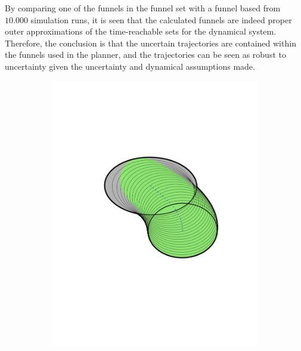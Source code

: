 By comparing one of the funnels in the funnel set with a funnel based from
\(10.000\) simulation runs, it is seen that the calculated funnels are indeed
proper outer approximations of the time-reachable sets for the dynamical system.
Therefore, the conclusion is that the uncertain trajectories are contained
within the funnels used in the planner, and the trajectories can be seen as
robust to uncertainty given the uncertainty and dynamical assumptions made.

\begin{figure}
  \begin{subfigure}[b]{0.3\textwidth}
    \includegraphics[width=\textwidth]{figures/method/FunnelSimnew4}
  \end{subfigure}
  \begin{subfigure}[b]{0.3\textwidth}

\end{subfigure}
\end{figure}
